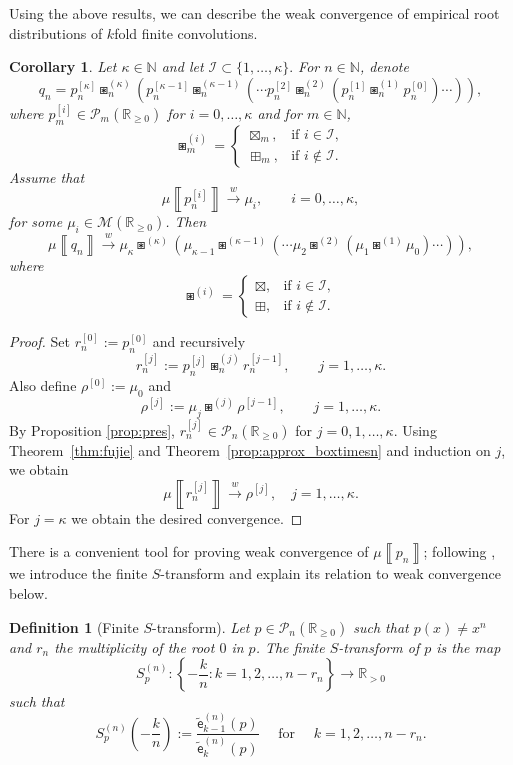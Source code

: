\documentclass[a4paper,11pt]{amsart}
\numberwithin{equation}{section}
\newtheorem{corollary}[theorem]{Corollary}
\newtheorem{definition}[theorem]{Definition}
\newcommand{\weak}{\xrightarrow{w}}
\newcommand{\N}{\mathbb{N}}
\newcommand{\R}{\mathbb{R}}
\newcommand{\polplus}{\mathcal P_n(\mathbb R_{\geq 0})}
\newcommand{\pols}{\mathcal P}
\newcommand{\MM}{\mathcal{M}}
\newcommand{\meas}[1]{\mu\! \left\llbracket #1 \right\rrbracket}
\newcommand{\coef}[2]{\widetilde{\mathsf{e}}_{#1}^{(#2)}} %
\newcommand{\strans}[2]{S_{#1}^{(#2)}}   %
\begin{document}
Using the above results, we can describe the weak convergence of empirical root distributions of $k$fold finite convolutions. 
\begin{corollary}
\label{cor:iterated_approximation}
Let $\kappa\in\N$ and let $\mathcal{I}\subset\{1,\dots,\kappa\}.$ For $n\in\N$, denote
\[
q_n
=
p_{n}^{[\kappa]}\boxast_n^{(\kappa)} \left( p_{n}^{[\kappa-1]}\boxast_n^{(\kappa-1)}\left(\cdots p_n^{[2]}\boxast_n^{(2)}\left( p_{n}^{[1]}\boxast_n^{(1)} p_n^{[0]}\right)\cdots \right)\right),
\]
where \(p_m^{[i]}\in \pols_m(\R_{\geq 0})\) for \(i=0,\ldots,\kappa\) and for $m\in\N$, 
\[
\boxast_m^{(i)} =
\begin{cases}
  \boxtimes_m,       & \text{if } i \in\mathcal{I}, \\
  \boxplus_m,      & \text{if } i \notin \mathcal{I}.
\end{cases}
\]
Assume that
\[
\meas{p_n^{[i]}}\weak \mu_i, \qquad i=0,\ldots,\kappa,
\]
for some \(\mu_i\in \MM(\R_{\geq 0})\). Then
\[
\meas{q_n}\weak \mu_\kappa\boxast^{(\kappa)} \left( \mu_{\kappa-1}\boxast^{(\kappa-1)}\left(\cdots \mu_2 \boxast^{(2)}\left( \mu_1\boxast^{(1)} \mu_0\right)\cdots \right)\right),
\]
where
\[
\boxast^{(i)} =
\begin{cases}
  \boxtimes,       & \text{if } i \in\mathcal{I}, \\
  \boxplus,      & \text{if } i \notin \mathcal{I}.
\end{cases}
\]
\end{corollary}

\begin{proof}
Set \(r_n^{[0]}:=p_n^{[0]}\) and recursively
\[
r_n^{[j]}:=p_n^{[j]}\boxast_n^{(j)} r_n^{[j-1]}, \qquad j=1,\dots,\kappa.
\]
Also define \(\rho^{[0]}:=\mu_0\) and
\[
\rho^{[j]}:=\mu_j\boxast^{(j)}\rho^{[j-1]}, \qquad j=1,\dots,\kappa.
\]
By Proposition \ref{prop:pres}, $r_n^{[j]}\in\pols_n(\R_{\geq 0})$ for $j=0,1,\ldots,\kappa$. Using Theorem~\ref{thm:fujie} and Theorem~\ref{prop:approx_boxtimesn} and induction on $j$, we obtain 
\[
\meas{r_n^{[j]}}\weak \rho^{[j]},\quad j=1,\ldots,\kappa. 
\]
For \(j=\kappa\) we obtain the desired convergence.
\end{proof}


There is a convenient tool for proving weak convergence of $\meas{p_n}$; following \cite{AFPU24}, we introduce the finite $S$-transform and explain its relation to weak convergence below.

\begin{definition}[Finite $S$-transform]
\label{def:finite.Strans}
Let $p \in \polplus$ such that $p(x)\neq x^n$ and $r_n$ the multiplicity of the root $0$ in $p$. The finite $S$-transform of $p$ is the map 
\[S_p^{(n)} \colon \left\{-\frac{k}{n}\colon  k =1,2,\dots, n-r_n \right\} \to \R_{> 0}\] such that
\begin{equation}
\label{eq:def.Strans}
\strans{p}{n}\left(-\frac{k}{n}\right) := \frac{\coef{k-1}{n}(p)}{\coef{k}{n}(p)} \quad \text{ for } \quad k=1,2, \dots, n-r_n.
\end{equation}
\end{definition}
\end{document}
